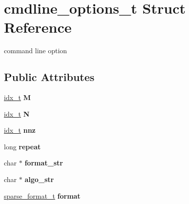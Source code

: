 \hypertarget{structcmdline__options__t}{}\section{cmdline\+\_\+options\+\_\+t Struct Reference}
\label{structcmdline__options__t}


command line option  


\subsection*{Public Attributes}
\begin{DoxyCompactItemize}
\item 
\mbox{\label{structcmdline__options__t_aeb40f98dbcd53dc727b1d7dbb566924f}} 
\hyperlink{spmv_8cc_a8e93478a00e685bea5e6a3f617bf03a3}{idx\+\_\+t} {\bfseries M}
\item 
\mbox{\label{structcmdline__options__t_aa58f87808071259b5aa8f17c64bf2960}} 
\hyperlink{spmv_8cc_a8e93478a00e685bea5e6a3f617bf03a3}{idx\+\_\+t} {\bfseries N}
\item 
\mbox{\label{structcmdline__options__t_aec8f7846348926cda6d62023f62d0d25}} 
\hyperlink{spmv_8cc_a8e93478a00e685bea5e6a3f617bf03a3}{idx\+\_\+t} {\bfseries nnz}
\item 
\mbox{\label{structcmdline__options__t_acb60cada2976487316be88bf4309e7d6}} 
long {\bfseries repeat}
\item 
\mbox{\label{structcmdline__options__t_a16fe2748dfda1fc639d7e3321eb0e4a9}} 
char $\ast$ {\bfseries format\+\_\+str}
\item 
\mbox{\label{structcmdline__options__t_ae8ab407cdc87a30c1b4cdf6b424c8370}} 
char $\ast$ {\bfseries algo\+\_\+str}
\item 
\mbox{\label{structcmdline__options__t_af8a99d8cdebe0bc5fd512d2254727231}} 
\hyperlink{spmv_8cc_a8c0094893526c01b430903b2d9227256}{sparse\+\_\+format\+\_\+t} {\bfseries format}
\item 
\mbox{\label{structcmdline__options__t_afddf83f65e6e4a14761d84a5e876e6ac}} 

\end{DoxyCompactItemize}

